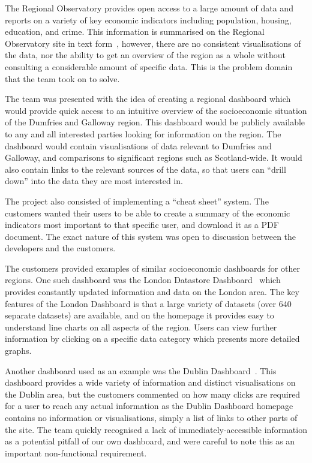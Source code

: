 \documentclass{l3proj}
\begin{document}

The Regional Observatory provides open access to a large amount of data and reports on a variety of key economic indicators including population, housing, education, and crime. This information is summarised on the Regional Observatory site in text form~\cite{PopulationHealthReport}, however, there are no consistent visualisations of the data, nor the ability to get an overview of the region as a whole without consulting a considerable amount of specific data. This is the problem domain that the team took on to solve.

The team was presented with the idea of creating a regional dashboard which would provide quick access to an intuitive overview of the socioeconomic situation of the Dumfries and Galloway region. This dashboard would be publicly available to any and all interested parties looking for information on the region. The dashboard would contain visualisations of data relevant to Dumfries and Galloway, and comparisons to significant regions such as Scotland-wide. It would also contain links to the relevant sources of the data, so that users can ``drill down'' into the data they are most interested in.

The project also consisted of implementing a ``cheat sheet'' system. The customers wanted their users to be able to create a summary of the economic indicators most important to that specific user, and download it as a PDF document. The exact nature of this system was open to discussion between the developers and the customers.

The customers provided examples of similar socioeconomic dashboards for other regions. One such dashboard was the London Datastore Dashboard~\cite{LondonDashboard} which provides constantly updated information and data on the London area. The key features of the London Dashboard is that a large variety of datasets (over 640 separate datasets) are available, and on the homepage it provides easy to understand line charts on all aspects of the region. Users can view further information by clicking on a specific data category which presents more detailed graphs.

Another dashboard used as an example was the Dublin Dashboard~\cite{DublinDashboard}. This dashboard provides a wide variety of information and distinct visualisations on the Dublin area, but the customers commented on how many clicks are required for a user to reach any actual information as the Dublin Dashboard homepage contains no information or visualisations, simply a list of links to other parts of the site. The team quickly recognised a lack of immediately-accessible information as a potential pitfall of our own dashboard, and were careful to note this as an important non-functional requirement.
\end{document}
